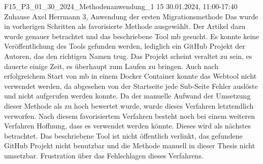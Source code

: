 \fieldnote
{F15\_P3\_01\_30\_2024\_Methodenanwendung\_1}
{15}
{30.01.2024, 11:00-17:40}
{Zuhause}
{Axel Herrmann}
{3, Anwendung der ersten Migrationsmethode}
{
  Das  wurde in vorherigen Schritten als favorisierte Methode ausgewählt.
  Der Artikel dazu wurde genauer betrachtet und das beschriebene Tool \acrfull{mb} gesucht.
  Es konnte keine Veröffentlichung des Tools gefunden werden, lediglich ein GitHub Projekt der Autoren, das den richtigen Namen trug.
  Das Projekt scheint veraltet zu sein, es dauerte einige Zeit, es überhaupt zum Laufen zu bringen.
  Auch nach erfolgreichem Start von \gls{mb} in einem Docker Container konnte das Webtool nicht verwendet werden, da abgesehen von der Startseite jede Sub-Seite Fehler auslöste und nicht aufgerufen werden konnte.
  Da der manuelle Aufwand der Umsetzung dieser Methode als zu hoch bewertet wurde, wurde dieses Verfahren letztendlich verworfen.
}
{
  Nach diesem favorisiertem Verfahren besteht noch bei einem weiteren Verfahren Hoffnung, dass es verwendet werden könnte.
  Dieses wird als nächstes betrachtet.
}
{
}
{
  Das beschriebene Tool ist nicht öffentlich verlinkt, das gefundene GitHub Projekt nicht benutzbar und die Methode manuell in dieser Thesis nicht umsetzbar.
}
{
  Frustration über das Fehlschlagen dieses Verfahrens.
}
